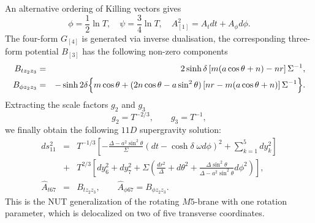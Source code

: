 \documentclass[a4paper,12pt]{article}
\begin{document}
An alternative ordering of Killing vectors gives
\begin{equation}
\phi = \frac12 \ln T, \quad \psi = \frac34 \ln T, \quad A_{[1]}^2
= A_t dt + A_\phi d\phi.
\end{equation}
The four-form $G_{[4]}$ is generated via inverse dualisation, the
corresponding three-form potential $B_{[3]}$ has the following
non-zero components
\begin{eqnarray}
B_{tz_2z_3} &=& 2 \sinh\delta \left[ m(a\cos\theta+n)-nr \right]
\Sigma^{-1}, \\
B_{\phi z_2z_3} &=& - \sinh2\delta \Bigl\{ m \cos\theta +
(2n\cos\theta-a\sin^2\theta) \left[ nr-m(a\cos\theta+n)\right]
\Sigma^{-1} \Bigr\}. \nonumber
\end{eqnarray}
Extracting the scale factors  $g_2$ and $g_3$
\begin{equation}
g_2 = T^{-2/3}, \qquad g_3 = T^{-1},
\end{equation}
we finally obtain the following $11D$ supergravity solution:
\begin{eqnarray}
ds_{11}^2 &=& T^{-1/3}
\left[-\frac{\Delta-a^2\sin^2\theta}{\Sigma} \left( dt -
\cosh\delta\;\omega d\phi \right)^2 + \sum_{k=1}^5 dy_k^2 \right]
\nonumber\\
&+& T^{2/3} \left[ dy_6^2 + dy_7^2 + \Sigma \left( \frac{d
r^2}{\Delta} + d\theta^2 + \frac{\Delta\sin^2\theta}{\Delta -
a^2\sin^2\theta}d\phi^2 \right)\right], \nonumber \\
\hat A_{t67} &=& B_{tz_2z_3}, \qquad \hat A_{\phi 67} = B_{\phi
z_2z_3}. \label{5DDM}
\end{eqnarray}
This is the NUT generalization of the rotating $M5$-brane with
one rotation parameter, which is delocalized on two of five
transverse coordinates.
\end{document}
